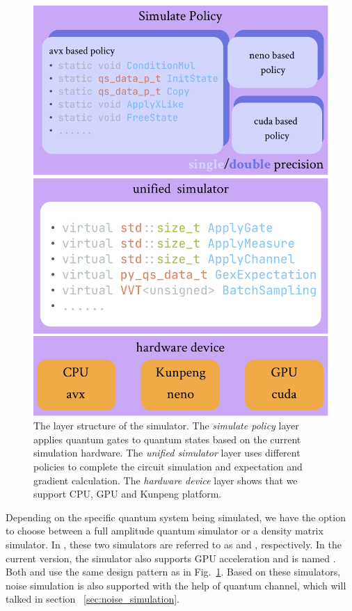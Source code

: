 \begin{figure}[ht]
    \centering
    \includegraphics[scale=0.6]{./images/4_1_simulator_structure.pdf}
    \captionsetup{justification=raggedright,singlelinecheck=false}
    \caption{\label{4_1_sim_str} The layer structure of the simulator. The \textit{simulate policy} layer applies quantum gates to quantum states based on the current simulation hardware. The \textit{unified simulator} layer uses different policies to complete the circuit simulation and expectation and gradient calculation. The \textit{hardware device} layer shows that we support CPU, GPU and Kunpeng platform.}
\end{figure}

Depending on the specific quantum system being simulated, we have the option to choose between a full amplitude quantum simulator or a density matrix simulator. In \MindQuantum, these two simulators are referred to as  and , respectively. In the current \version version, the  simulator also supports GPU acceleration and is named . Both  and  use the same design pattern as in Fig.~\ref{4_1_sim_str}. Based on these simulators, noise simulation is also supported with the help of quantum channel, which will talked in section ~\ref{sec:noise_simulation}.

